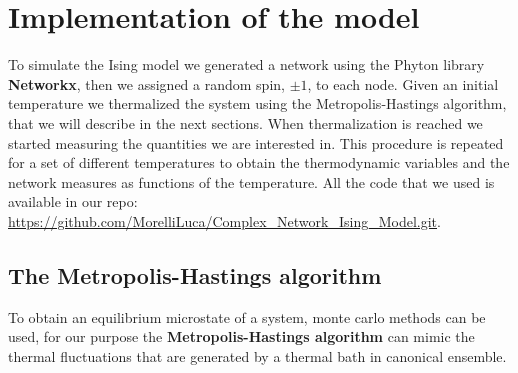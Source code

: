 \section{Implementation of the model}
To simulate the Ising model we generated a network using the Phyton library \textbf{Networkx}, then we assigned a random spin, $\pm1$, to each node. Given an initial temperature we thermalized the system using the Metropolis-Hastings algorithm, that we will describe in the next sections. When thermalization is reached we started measuring the quantities we are interested in. This procedure is repeated for a set of different temperatures to obtain the thermodynamic variables and the network measures as functions of the temperature.
All the code that we used is available in our repo: \url{https://github.com/MorelliLuca/Complex_Network_Ising_Model.git}.
\subsection{The Metropolis-Hastings algorithm}
To obtain an equilibrium microstate of a system, monte carlo methods can be used, for our purpose the \textbf{Metropolis-Hastings algorithm} can mimic the thermal fluctuations that are generated by a thermal bath in canonical ensemble.

